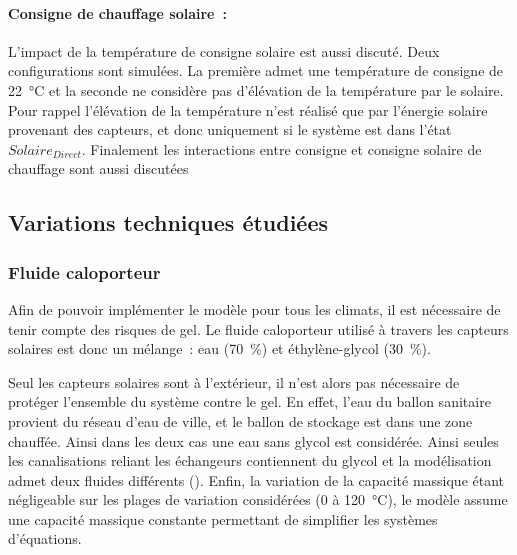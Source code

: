 \paragraph{Consigne de chauffage solaire~:} %
\label{par:consigne_de_chauffage_solaire}
L’impact de la température de consigne solaire est aussi discuté. Deux configurations sont
simulées. La première admet une température de consigne de \SI{22}{\celsius} et la seconde
ne considère pas d’élévation de la température par le solaire. Pour rappel l’élévation de
la température n’est réalisé que par l’énergie solaire provenant des capteurs, et donc
uniquement si le système est dans l’état $Solaire_{Direct}$. Finalement les interactions
entre consigne et consigne solaire de chauffage sont aussi discutées


\subsection{Variations techniques étudiées} %
\label{sub:variations_techniques_etudiees}
\subsubsection{Fluide caloporteur} %
\label{ssub:fluide_caloporteur}
Afin de pouvoir implémenter le modèle pour tous les climats, il est nécessaire de
tenir compte des risques de gel. Le fluide caloporteur utilisé à travers les capteurs
solaires est donc un mélange~: eau (\SI{70}{\percent}) et éthylène-glycol (\SI{30}{\percent}).

Seul les capteurs solaires sont à l’extérieur, il n’est alors pas nécessaire de protéger
l’ensemble du système contre le gel. En effet, l’eau du ballon sanitaire provient du
réseau d’eau de ville, et le ballon de stockage est dans une zone chauffée. Ainsi dans les
deux cas une eau sans glycol est considérée. Ainsi seules les canalisations reliant les
échangeurs contiennent du glycol et la modélisation admet deux fluides différents
(). Enfin, la variation de la capacité massique étant négligeable sur
les plages de variation considérées (\num{0} à \SI{120}{\celsius}), le modèle assume une
capacité massique constante permettant de simplifier les systèmes d’équations.

